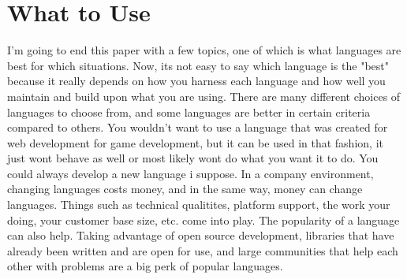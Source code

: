 \documentclass[letterpaper, 10 pt, conference]{IEEEtran}
\begin{document}
\section{What to Use}
\indent I'm going to end this paper with a few topics, one of which is what languages are best for which situations. Now, its not easy to say which language is the "best" because it really depends on how you harness each language and how well you maintain and build upon what you are using. There are many different choices of languages to choose from, and some languages are better in certain criteria compared to others. You wouldn't want to use a language that was created for web development for game development, but it can be used in that fashion, it just wont behave as well or most likely wont do what you want it to do. You could always develop a new language i suppose. In a company environment, changing languages costs money, and in the same way, money can change languages. Things such as technical qualitites, platform support, the work your doing, your customer base size, etc. come into play. The popularity of a language can also help. Taking advantage of open source development, libraries that have already been written and are open for use, and large communities that help each other with problems are a big perk of popular languages. 
\newline
\end{document}
